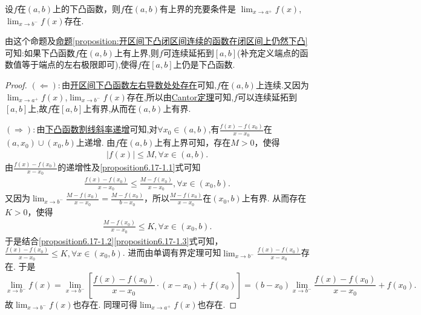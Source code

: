 \documentclass[lang=cn,newtx,10pt,scheme=chinese]{elegantbook}
\begin{document}
\begin{proposition}\label{proposition:开区间的下凸函数有上界的充要条件}
设\(f\)在\((a,b)\)上的下凸函数，则\(f\)在\((a,b)\)有上界的充要条件是
$\lim_{x\rightarrow a^{+}}f(x)$,$\lim_{x\rightarrow b^{-}}f(x)$存在.
\end{proposition}
\begin{note}
由这个命题及\hyperref[proposition:开区间下凸闭区间连续的函数在闭区间上仍然下凸]{命题\ref{proposition:开区间下凸闭区间连续的函数在闭区间上仍然下凸}}可知:如果下凸函数$f$在$(a,b)$上有上界,则$f$可连续延拓到$[a,b]$(补充定义端点的函数值等于端点的左右极限即可),使得$f$在$[a,b]$上仍是下凸函数.
\end{note}
\begin{proof}
$(\Leftarrow):$由\hyperref[theorem:开区间下凸函数左右导数处处存在]{开区间下凸函数左右导数处处存在}可知,$f$在$(a,b)$上连续.又因为$\lim_{x\rightarrow a^{+}}f(x)$,$\lim_{x\rightarrow b^{-}}f(x)$存在,所以由\hyperref[theorem:Cantor定理]{Cantor定理}可知,$f$可以连续延拓到$[a,b]$上,故$f$在$[a,b]$上有界,从而在$(a,b)$上有界.

$(\Rightarrow):$由\hyperref[下凸函数割线斜率递增]{下凸函数割线斜率递增}可知,对$\forall x_0\in (a,b)$,有\(\frac{f(x) - f(x_0)}{x - x_0}\)在\((a, x_0)\cup(x_0, b)\)上递增. 由\(f\)在\((a, b)\)上有上界可知，存在\(M > 0\)，使得
\begin{align}
|f(x)|\leqslant M, \forall x\in(a, b). \label{proposition6.17-1.1}
\end{align}
由\(\frac{f(x) - f(x_0)}{x - x_0}\)的递增性及\eqref{proposition6.17-1.1}式可知
\begin{align}
\frac{f(x) - f(x_0)}{x - x_0}\leqslant\frac{M - f(x_0)}{x - x_0}, \forall x\in(x_0, b). \label{proposition6.17-1.2}
\end{align}
又因为\(\lim_{x\rightarrow b^-}\frac{M - f(x_0)}{x - x_0}=\frac{M - f(x_0)}{b - x_0}\)，所以\(\frac{M - f(x_0)}{x - x_0}\)在\((x_0, b)\)上有界. 从而存在\(K > 0\)，使得
\begin{align}
\frac{M - f(x_0)}{x - x_0}\leqslant K, \forall x\in(x_0, b).
\label{proposition6.17-1.3}  
\end{align}
于是结合\eqref{proposition6.17-1.2}\eqref{proposition6.17-1.3}式可知，\(\frac{f(x) - f(x_0)}{x - x_0}\leqslant K, \forall x\in(x_0, b)\). 进而由单调有界定理可知\(\lim_{x\rightarrow b^-}\frac{f(x) - f(x_0)}{x - x_0}\)存在. 于是
\[
\lim_{x\rightarrow b^-}f(x)=\lim_{x\rightarrow b^-}\left[\frac{f(x) - f(x_0)}{x - x_0}\cdot(x - x_0)+f(x_0)\right]=(b - x_0)\lim_{x\rightarrow b^-}\frac{f(x) - f(x_0)}{x - x_0}+f(x_0).
\]
故\(\lim_{x\rightarrow b^-}f(x)\)也存在. 同理可得\(\lim_{x\rightarrow a^+}f(x)\)也存在.

\end{proof}
\end{document}
